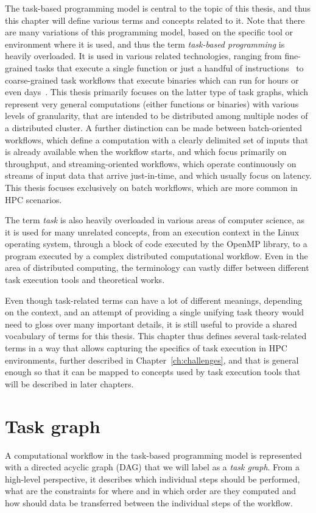 The task-based programming model is central to the topic of this thesis, and thus this chapter will
define various terms and concepts related to it. Note that there are many variations of this
programming model, based on the specific tool or environment where it is used, and thus the term
\emph{task-based programming} is heavily overloaded. It is used in various related technologies, ranging
from fine-grained tasks that execute a single function or just a handful of
instructions~\cite{starpu,openmp} to coarse-grained task workflows that execute binaries which
can run for hours or even days~\cite{dask, snakemake, nextflow}. This thesis primarily focuses on the latter
type of task graphs, which represent very general computations (either functions or binaries) with
various levels of granularity, that are intended to be distributed among multiple nodes of a
distributed cluster. A further distinction can be made between batch-oriented workflows, which
define a computation with a clearly delimited set of inputs that is already available when the
workflow starts, and which focus primarily on throughput, and streaming-oriented workflows, which
operate continuously on streams of input data that arrive just-in-time, and which usually focus on
latency. This thesis focuses exclusively on batch workflows, which are more common in HPC
scenarios.

The term \emph{task} is also heavily overloaded in various areas of computer science, as
it is used for many unrelated concepts, from an execution context in the Linux operating system,
through a block of code executed by the OpenMP library, to a program executed by a complex
distributed computational workflow. Even in the area of distributed computing, the terminology can
vastly differ between different task execution tools and theoretical works.

Even though task-related terms can have a lot of different meanings, depending on the context, and
an attempt of providing a single unifying task theory would need to gloss over many important
details, it is still useful to provide a shared vocabulary of terms for this thesis. This chapter
thus defines several task-related terms in a way that allows capturing the specifics of task
execution in HPC environments, further described in Chapter~\ref{ch:challenges}, and that is
general enough so that it can be mapped to concepts used by task execution tools that will be
described in later chapters.


\section{Task graph}
A computational workflow in the task-based programming model is represented with a directed acyclic
graph (DAG) that we will label as a \emph{task graph}. From a high-level perspective, it
describes which individual steps should be performed, what are the constraints for where and in
which order are they computed and how should data be transferred between the individual steps of
the workflow.


